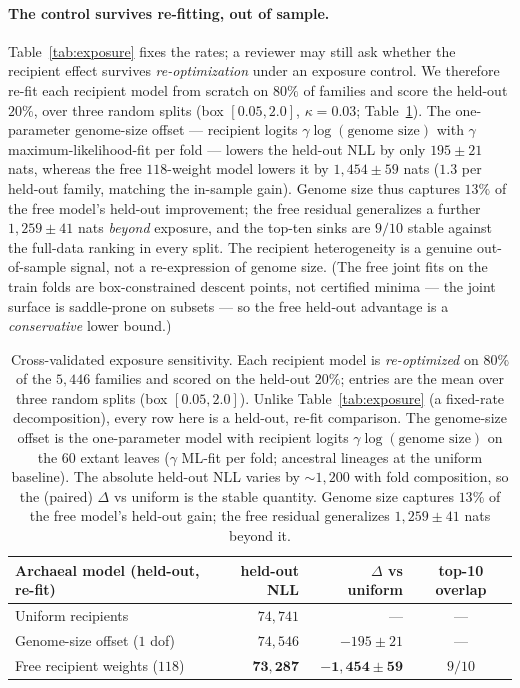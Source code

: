 \documentclass[11pt]{article}
\begin{document}
\paragraph{The control survives re-fitting, out of sample.} Table~\ref{tab:exposure} fixes
the rates; a reviewer may still ask whether the recipient effect survives \emph{re-optimization}
under an exposure control. We therefore re-fit each recipient model from scratch on $80\%$ of
families and score the held-out $20\%$, over three random splits (box $[0.05,2.0]$,
$\kappa{=}0.03$; Table~\ref{tab:exposure-cv}). The one-parameter genome-size offset --- recipient
logits $\gamma\log(\text{genome size})$ with $\gamma$ maximum-likelihood-fit per fold --- lowers
the held-out NLL by only $195\pm21$ nats, whereas the free $118$-weight model lowers it by
$1{,}454\pm59$ nats ($1.3$ per held-out family, matching the in-sample gain). Genome size thus
captures $13\%$ of the free model's held-out improvement; the free residual generalizes a further
$1{,}259\pm41$ nats \emph{beyond} exposure, and the top-ten sinks are $9/10$ stable against the
full-data ranking in every split. The recipient heterogeneity is a genuine out-of-sample signal,
not a re-expression of genome size. (The free joint fits on the train folds are box-constrained
descent points, not certified minima --- the joint surface is saddle-prone on subsets --- so the
free held-out advantage is a \emph{conservative} lower bound.)

\begin{table}[h]\centering
\caption{Cross-validated exposure sensitivity. Each recipient model is \emph{re-optimized} on
$80\%$ of the $5{,}446$ families and scored on the held-out $20\%$; entries are the mean over three
random splits (box $[0.05,2.0]$). Unlike Table~\ref{tab:exposure} (a fixed-rate decomposition),
every row here is a held-out, re-fit comparison. The genome-size offset is the one-parameter model
with recipient logits $\gamma\log(\text{genome size})$ on the $60$ extant leaves ($\gamma$ ML-fit per
fold; ancestral lineages at the uniform baseline). The absolute held-out NLL varies by $\sim\!1{,}200$
with fold composition, so the (paired) $\Delta$ vs uniform is the stable quantity. Genome size captures
$13\%$ of the free model's held-out gain; the free residual generalizes $1{,}259\pm41$ nats beyond it.}
\label{tab:exposure-cv}
\small
\begin{tabular}{lrrc}
\toprule
Archaeal model (held-out, re-fit) & held-out NLL & $\Delta$ vs uniform & top-10 overlap \\
\midrule
Uniform recipients              & $74{,}741$          & ---                      & --- \\
Genome-size offset ($1$ dof)    & $74{,}546$          & $-195\pm21$              & --- \\
Free recipient weights ($118$)  & $\mathbf{73{,}287}$ & $\mathbf{-1{,}454\pm59}$ & $9/10$ \\
\bottomrule
\end{tabular}
\end{table}
\end{document}

